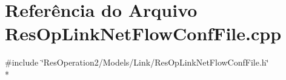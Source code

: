 \section{Referência do Arquivo Res\+Op\+Link\+Net\+Flow\+Conf\+File.\+cpp}
\label{_res_op_link_net_flow_conf_file_8cpp}
{\ttfamily \#include \char`\"{}Res\+Operation2/\+Models/\+Link/\+Res\+Op\+Link\+Net\+Flow\+Conf\+File.\+h\char`\"{}}\\*
